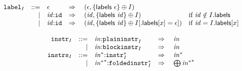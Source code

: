 \vspace{1ex}

$$
\begin{array}[t]{@{}lrrl@{}l@{}l@{}l@{}}
& {{\mathtt{label}}}_{I} & ::= & \epsilon & \quad\Rightarrow\quad{} & (\epsilon, \{ \mathsf{labels}~\epsilon \} \oplus I) \\
& & | & {\mathit{id}}{:}{\mathtt{id}} & \quad\Rightarrow\quad{} & ({\mathit{id}}, \{ \mathsf{labels}~{\mathit{id}} \} \oplus I) & \quad \mbox{if}~ {\mathit{id}} \notin I{.}\mathsf{labels} \\
& & | & {\mathit{id}}{:}{\mathtt{id}} & \quad\Rightarrow\quad{} & ({\mathit{id}}, \{ \mathsf{labels}~{\mathit{id}} \} \oplus I{}[{.}\mathsf{labels}{}[x] = \epsilon]) & \quad \mbox{if}~ {\mathit{id}} = I{.}\mathsf{labels}{}[x] \\
\end{array}
$$

\vspace{1ex}

$$
\begin{array}[t]{@{}lrrl@{}l@{}l@{}l@{}}
& {{\mathtt{instr}}}_{I} & ::= & {\mathit{in}}{:}{{\mathtt{plaininstr}}}_{I} & \quad\Rightarrow\quad{} & {\mathit{in}} \\
& & | & {\mathit{in}}{:}{{\mathtt{blockinstr}}}_{I} & \quad\Rightarrow\quad{} & {\mathit{in}} \\
& {{\mathtt{instrs}}}_{I} & ::= & {{\mathit{in}}^\ast}{:}{{{\mathtt{instr}}}_{I}^\ast} & \quad\Rightarrow\quad{} & {{\mathit{in}}^\ast} \\
& & | & {{{\mathit{in}}^\ast}^\ast}{:}{{{\mathtt{foldedinstr}}}_{I}^\ast} & \quad\Rightarrow\quad{} & {\bigoplus}\, {{{\mathit{in}}^\ast}^\ast} \\
\end{array}
$$

\vspace{1ex}

